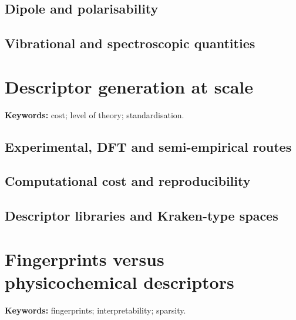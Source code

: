 \subsection{Dipole and polarisability}


\subsection{Vibrational and spectroscopic quantities}


\section{Descriptor generation at scale}

\begin{warningbox}
\textbf{Keywords:} cost; level of theory; standardisation.
\end{warningbox}

\subsection{Experimental, DFT and semi-empirical routes}


\subsection{Computational cost and reproducibility}


\subsection{Descriptor libraries and Kraken-type spaces}


\section{Fingerprints versus physicochemical descriptors}

\begin{insightbox}
\textbf{Keywords:} fingerprints; interpretability; sparsity.
\end{insightbox}

